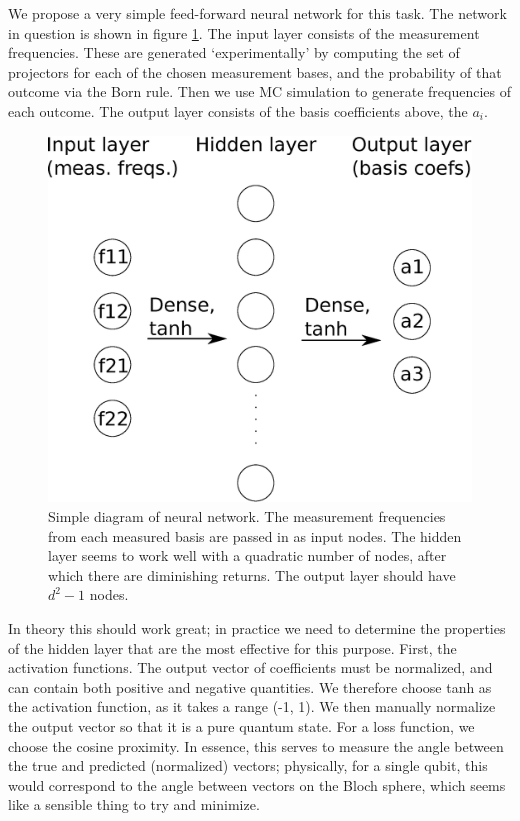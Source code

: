 \documentclass[a4paper,10pt]{article}
\begin{document}
We propose a very simple feed-forward neural network for this task. 
The network in question is shown in figure \ref{fig:nn}. The input layer consists of the measurement frequencies. These are generated `experimentally' by computing the set of projectors for each of the chosen measurement bases, and the probability of that outcome via the Born rule. Then we use MC simulation to generate frequencies of each outcome. The output layer consists of the basis coefficients above, the $a_i$.

\begin{figure}
 \includegraphics[scale=0.5]{nn_schematic}
 \caption{Simple diagram of neural network. The measurement frequencies from each measured basis are passed in as input nodes. The hidden layer seems to work well with a quadratic number of nodes, after which there are diminishing returns. The output layer should have $d^2 - 1$ nodes.}
 \label{fig:nn}
\end{figure}


In theory this should work great; in practice we need to determine the properties of the hidden layer that are the most effective for this purpose. First, the activation functions. The output vector of coefficients must be normalized, and can contain both positive and negative quantities. We therefore choose tanh as the activation function, as it takes a range (-1, 1). We then manually normalize the output vector so that it is a pure quantum state. For a loss function, we choose the cosine proximity. In essence, this serves to measure the angle between the true and predicted (normalized) vectors; physically, for a single qubit, this would correspond to the angle between vectors on the Bloch sphere, which seems like a sensible thing to try and minimize.
\end{document}

